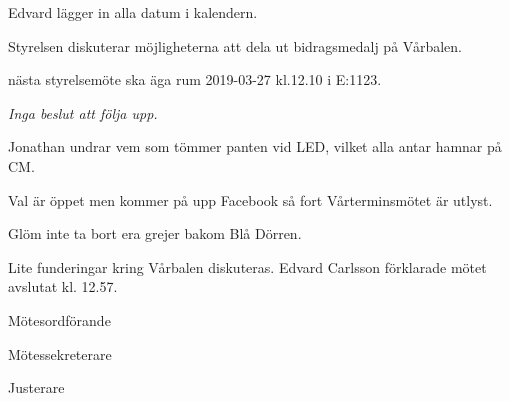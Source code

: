 \documentclass[10pt]{article}
\def\mo{Edvard Carlsson}
\def\ms{Sonja Kenari}
\def\ji{Jonathan Benitez}
\begin{document}
\begin{paragrafer}
Edvard lägger in alla datum i kalendern.

Styrelsen diskuterar möjligheterna att dela ut bidragsmedalj  på Vårbalen. 


\Mba nästa styrelsemöte ska äga rum 2019-03-27 kl.12.10 i E:1123.

\textit{Inga beslut att följa upp.}


Jonathan undrar vem som tömmer panten vid LED, vilket alla antar hamnar på CM.

Val är öppet men kommer på upp Facebook så fort Vårterminsmötet är utlyst.

Glöm inte ta bort era grejer bakom Blå Dörren.

Lite funderingar kring Vårbalen diskuteras. 
{\mo} förklarade mötet avslutat kl. 12.57.
\end{paragrafer}

\hidesignfoot
\begin{signatures}{3}
\signature{\mo}{Mötesordförande}
\signature{\ms}{Mötessekreterare}
\signature{\ji}{Justerare}
\end{signatures}
\end{document}
